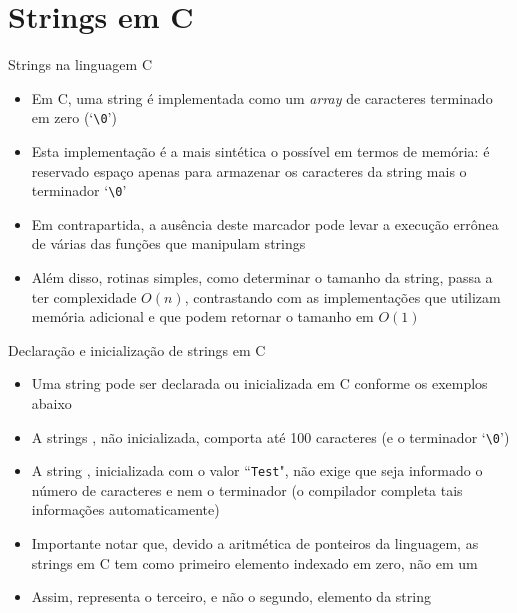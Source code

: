 \section{Strings em C}

\begin{frame}[fragile]{Strings na linguagem C}

    \begin{itemize}
        \item Em C, uma string é implementada como um \textit{array} de caracteres terminado em 
            zero (`\verb|\0|') 

        \item Esta implementação é a mais sintética o possível em termos de memória: é reservado 
            espaço apenas para armazenar os caracteres da string mais o terminador `\verb|\0|'

        \item Em contrapartida, a ausência deste marcador pode levar a execução errônea de várias 
            das funções que manipulam strings

        \item Além disso, rotinas simples, como determinar o tamanho da string, passa a ter complexidade $O(n)$, contrastando com as implementações que utilizam memória adicional e que podem retornar o tamanho em $O(1)$
    \end{itemize}

\end{frame}

\begin{frame}[fragile]{Declaração e inicialização de strings em C}

    \begin{itemize}
        \item Uma string pode ser declarada ou inicializada em C conforme os exemplos abaixo

        \item A strings , não inicializada, comporta até 100 caracteres
            (e o terminador `\verb|\0|')

        \item A string , inicializada com o valor ``\texttt{Test}", não exige que 
            seja informado o número de caracteres e nem o terminador (o compilador completa tais informações automaticamente)

        \item Importante notar que, devido a aritmética de ponteiros da linguagem, as strings em 
            C tem como primeiro elemento indexado em zero, não em um

        \item Assim,  representa o terceiro, e não o segundo, elemento da string

    \end{itemize}

\end{frame}

